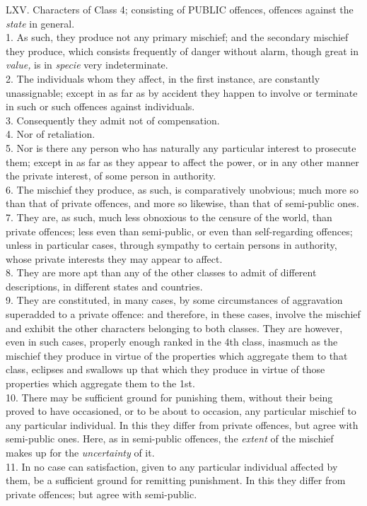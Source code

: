 \documentclass[12pt]{report}
\begin{document}
LXV. Characters of Class 4; consisting of PUBLIC offences, offences
against the \emph{state} in general.\\
1. As such, they produce not any primary mischief; and the secondary
mischief they produce, which consists frequently of danger without
alarm, though great in \emph{value,} is in \emph{specie} very
indeterminate.\\
2. The individuals whom they affect, in the first instance, are
constantly unassignable; except in as far as by accident they happen to
involve or terminate in such or such offences against individuals.\\
3. Consequently they admit not of compensation.\\
4. Nor of retaliation.\\
5. Nor is there any person who has naturally any particular interest to
prosecute them; except in as far as they appear to affect the power, or
in any other manner the private interest, of some person in authority.\\
6. The mischief they produce, as such, is comparatively unobvious; much
more so than that of private offences, and more so likewise, than that
of semi-public ones.\\
7. They are, as such, much less obnoxious to the censure of the world,
than private offences; less even than semi-public, or even than
self-regarding offences; unless in particular cases, through sympathy to
certain persons in authority, whose private interests they may appear to
affect.\\
8. They are more apt than any of the other classes to admit of different
descriptions, in different states and countries.\\
9. They are constituted, in many cases, by some circumstances of
aggravation superadded to a private offence: and therefore, in these
cases, involve the mischief and exhibit the other characters belonging
to both classes. They are however, even in such cases, properly enough
ranked in the 4th class, inasmuch as the mischief they produce in virtue
of the properties which aggregate them to that class, eclipses and
swallows up that which they produce in virtue of those properties which
aggregate them to the 1st.\\
10. There may be sufficient ground for punishing them, without their
being proved to have occasioned, or to be about to occasion, any
particular mischief to any particular individual. In this they differ
from private offences, but agree with semi-public ones. Here, as in
semi-public offences, the \emph{extent} of the mischief makes up for the
\emph{uncertainty} of it.\\
11. In no case can satisfaction, given to any particular individual
affected by them, be a sufficient ground for remitting punishment. In
this they differ from private offences; but agree with semi-public.
\end{document}
